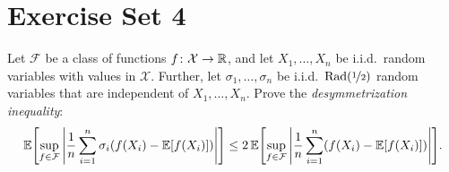 \section{Exercise Set 4}

\begin{exercise}
Let $\mathcal{F}$ be a class of functions $f \colon \mathcal{X} \to \mathbb{R}$, and let $X_1, \dots, X_n$ be i.i.d.\ random variables with values in $\mathcal{X}$. Further, let $\sigma_1, \dots, \sigma_n$ be i.i.d.\ $\operatorname{Rad}(\nicefrac{1}{2})$ random variables that are independent of $X_1, \dots, X_n$. Prove the \emph{desymmetrization inequality}:
\[
    \Exp\left[\sup_{f \in \mathcal{F}} \abs{\frac{1}{n} \sum_{i=1}^n \sigma_i (f(X_i) - \Exp[f(X_i)])}\right] \leq 2 \Exp\left[\sup_{f \in \mathcal{F}} \abs{\frac{1}{n} \sum_{i=1}^n (f(X_i) - \Exp[f(X_i)])}\right].
\]
\end{exercise}


\begin{exercise}
\end{exercise}


\begin{exercise}
\end{exercise}
